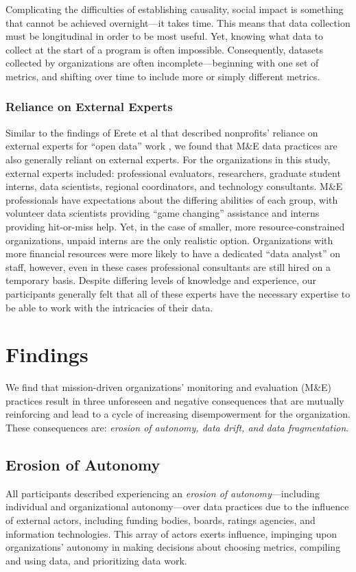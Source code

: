 Complicating the difficulties of establishing causality, social impact is something that cannot be achieved overnight---it takes time. This means that data collection must be longitudinal in order to be most useful. Yet, knowing what data to collect at the start of a program is often impossible. Consequently, datasets collected by organizations are often incomplete---beginning with one set of metrics, and shifting over time to include more or simply different metrics. 

\subsubsection{Reliance on External Experts}
Similar to the findings of Erete et al that described nonprofits’ reliance on external experts for “open data” work \citep{Erete2016Storytelling}, we found that M\&E data practices are also generally reliant on external experts. For the organizations in this study, external experts included: professional evaluators, researchers, graduate student interns, data scientists, regional coordinators, and technology consultants. M\&E professionals have expectations about the differing abilities of each group, with volunteer data scientists providing “game changing” assistance and interns providing hit-or-miss help. Yet, in the case of smaller, more resource-constrained organizations, unpaid interns are the only realistic option. Organizations with more financial resources were more likely to have a dedicated “data analyst” on staff, however, even in these cases professional consultants are still hired on a temporary basis. Despite differing levels of knowledge and experience, our participants generally felt that all of these experts have the necessary expertise to be able to work with the intricacies of their data. 

\section{Findings}
We find that mission-driven organizations’ monitoring and evaluation (M\&E) practices result in three unforeseen and negative consequences that are mutually reinforcing and lead to a cycle of increasing disempowerment for the organization. These consequences are: \textit{erosion of autonomy, data drift, and data fragmentation}.

\subsection{Erosion of Autonomy}
All participants described experiencing an \textit{erosion of autonomy}---including individual and organizational autonomy---over data practices due to the influence of external actors, including funding bodies, boards, ratings agencies, and information technologies. This array of actors exerts influence, impinging upon organizations’ autonomy in making decisions about choosing metrics, compiling and using data, and prioritizing data work.

